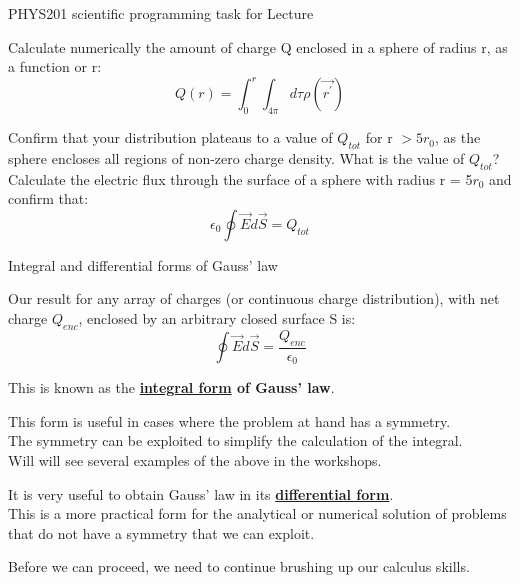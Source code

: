 {\begin{frame}{PHYS201 scientific programming task for Lecture \thislecture}
{\vspace{0.2cm}
Calculate numerically the amount of charge Q enclosed in a sphere of radius r, as a function or r:\\
\begin{equation*}
  Q(r) = \int_{0}^{r} \int_{4\pi} d\tau \rho(\vec{r^\prime})
\end{equation*}

\vspace{0.2cm}
Confirm that your distribution plateaus to a value of $Q_{tot}$ for
r $>5r_0$, as the sphere encloses all regions of non-zero charge density.
What is the value of $Q_{tot}$?\\

\vspace{0.2cm}
Calculate the electric flux through the surface of a sphere with radius r = 5$r_0$
and confirm that:
\begin{equation*}
  \epsilon_0 \oint \vec{E} d\vec{S} = Q_{tot}
\end{equation*}
}

\end{frame}

} %






%
%
%

\begin{frame}{Integral and differential forms of Gauss' law}

Our result for any array of charges (or continuous charge distribution), with net charge $Q_{enc}$,
enclosed by an arbitrary closed surface S is:
\begin{equation*}
  \oint \vec{E} d\vec{S} = \frac{Q_{enc}}{\epsilon_0}
\end{equation*}

This is known as the {\bf \underline{integral form} of Gauss' law}.\\
\vspace{0.2cm}

This form is useful in cases where the problem at hand has a symmetry.\\
The symmetry can be exploited to simplify the calculation of the integral.\\
Will will see several examples of the above in the workshops.\\
\vspace{0.2cm}

It is very useful to obtain Gauss' law in its {\bf \underline{differential form}}.\\
This is a more practical form for the analytical or numerical solution of problems
that do not have a symmetry that we can exploit.\\
\vspace{0.2cm}

Before we can proceed, we need to continue brushing up our calculus skills.

\end{frame}



